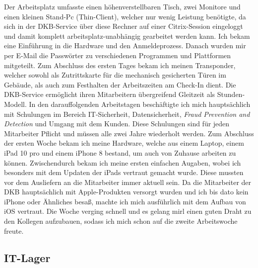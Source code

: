  Der Arbeitsplatz umfasste einen höhenverstellbaren Tisch, zwei Monitore und einen kleinen Stand-Pc (Thin-Client), welcher nur wenig Leistung benötigte, da sich in der DKB-Service über diese Rechner auf einer Citrix-Session eingeloggt und damit komplett arbeitsplatz-unabhängig gearbeitet werden kann. Ich bekam eine Einführung in die Hardware und den Anmeldeprozess. Danach wurden mir per E-Mail die Passwörter zu verschiedenen Programmen und Plattformen mitgeteilt. Zum Abschluss des ersten Tages bekam ich meinen Transponder, welcher sowohl als Zutrittskarte für die mechanisch gesicherten Türen im Gebäude, als auch zum Festhalten der Arbeitszeiten am Check-In dient. Die DKB-Service ermöglicht ihren Mitarbeitern übergreifend Gleitzeit als Stunden-Modell. In den darauffolgenden Arbeitstagen beschäftigte ich mich hauptsächlich mit Schulungen im Bereich IT-Sicherheit, Datensicherheit, \textit{Fraud Prevention and Detection} und Umgang mit dem Kunden. Diese Schulungen sind für jeden Mitarbeiter Pflicht und müssen alle zwei Jahre wiederholt werden. Zum Abschluss der ersten Woche bekam ich meine Hardware, welche aus einem Laptop, einem iPad 10 pro und einem iPhone 8 bestand, um auch von Zuhause arbeiten zu können. Zwischendurch bekam ich meine ersten einfachen Augaben, wobei ich besonders mit dem Updaten der iPads vertraut gemacht wurde. Diese mussten vor dem Ausliefern an die Mitarbeiter immer aktuell sein. Da die Mitarbeiter der DKB hauptsächlich mit Apple-Produkten versorgt wurden und ich bis dato kein iPhone oder Ähnliches besaß, machte ich mich ausführlich mit dem Aufbau von iOS vertraut. Die Woche verging schnell und es gelang mirl einen guten Draht zu den Kollegen aufzubauen, sodass ich mich schon auf die zweite Arbeitswoche freute.

\subsection{IT-Lager}
\label{sec:IT-Lager}


